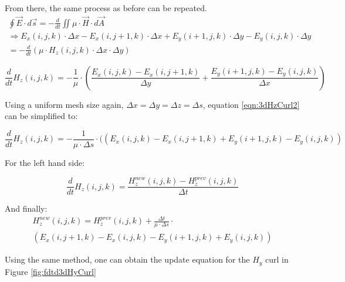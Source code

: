 From there, the same process as before can be repeated.
\begin{multline}
	\label{eqn:3dHzCurl1}
	\oint \vec{E} \cdot d\vec{s} = - \frac{d}{dt} \iint \mu \cdot \vec{H} \cdot d\vec{A} \\
	\Rightarrow E_x(i,j,k) \cdot \Delta x - E_x(i,j+1,k) \cdot \Delta x + E_y(i+1,j,k) \cdot \Delta y - E_y(i,j,k) \cdot \Delta y \\ = -\frac{d}{dt}(\mu \cdot H_z(i,j,k) \cdot \Delta x \cdot \Delta y)
\end{multline}

\begin{equation}
	\label{eqn:3dHzCurl2}
	\frac{d}{dt} H_z(i,j,k) = -\frac{1}{\mu} \cdot (\frac{E_x(i,j,k) - E_x(i,j+1,k)}{\Delta y} + \frac{E_y(i+1,j,k)- E_y(i,j,k)}{\Delta x})
\end{equation}

Using a uniform mesh size again, $\Delta x = \Delta y =  \Delta z = \Delta s$, equation \ref{eqn:3dHzCurl2} can be simplified to:

\begin{equation}
	\label{eqn:3dHzCurl3}
	\frac{d}{dt} H_z(i,j,k) = -\frac{1}{\mu \cdot \Delta s} \cdot ((E_x(i,j,k) - E_x(i,j+1,k) + E_y(i+1,j,k)- E_y(i,j,k))
\end{equation}

For the left hand side:

\begin{equation}
	\label{eqn:3dHzCurl4}
	\frac{d}{dt} H_z(i,j,k) = \frac{H_z^{new}(i,j,k) - H_z^{prev}(i,j,k)}{\Delta t}
\end{equation}

And finally:
\begin{multline}
	\label{eqn:3dHzCurlFinal}
	H_z^{new}(i,j,k) =  H_z^{prev}(i,j,k) + \frac{\Delta t}{\mu \cdot \Delta s} \cdot \\ (E_x(i,j+1,k) - E_x(i,j,k) - E_y(i+1,j,k) + E_y(i,j,k))
\end{multline}

Using the same method, one can obtain the update equation for the $H_y$ curl in Figure \ref{fig:fdtd3dHyCurl}

